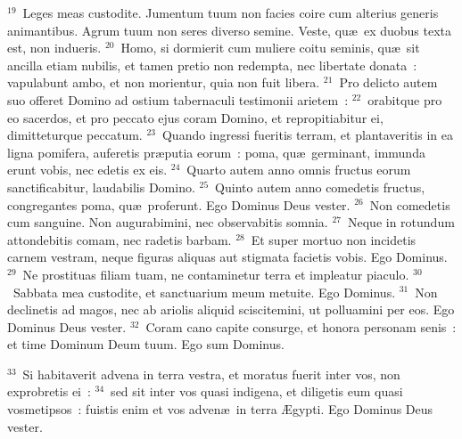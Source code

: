 ${}^{19}$~Leges meas custodite. Jumentum tuum non facies coire cum alterius generis animantibus. Agrum tuum non seres diverso semine. Veste, qu\ae\ ex duobus texta est, non indueris.
${}^{20}$~Homo, si dormierit cum muliere coitu seminis, qu\ae\ sit ancilla etiam nubilis, et tamen pretio non redempta, nec libertate donata~: vapulabunt ambo, et non morientur, quia non fuit libera.
${}^{21}$~Pro delicto autem suo offeret Domino ad ostium tabernaculi testimonii arietem~:
${}^{22}$~orabitque pro eo sacerdos, et pro peccato ejus coram Domino, et repropitiabitur ei, dimitteturque peccatum.
${}^{23}$~Quando ingressi fueritis terram, et plantaveritis in ea ligna pomifera, auferetis pr\ae putia eorum~: poma, qu\ae\ germinant, immunda erunt vobis, nec edetis ex eis.
${}^{24}$~Quarto autem anno omnis fructus eorum sanctificabitur, laudabilis Domino.
${}^{25}$~Quinto autem anno comedetis fructus, congregantes poma, qu\ae\ proferunt. Ego Dominus Deus vester.
${}^{26}$~Non comedetis cum sanguine. Non augurabimini, nec observabitis somnia.
${}^{27}$~Neque in rotundum attondebitis comam, nec radetis barbam.
${}^{28}$~Et super mortuo non incidetis carnem vestram, neque figuras aliquas aut stigmata facietis vobis. Ego Dominus.
${}^{29}$~Ne prostituas filiam tuam, ne contaminetur terra et impleatur piaculo.
${}^{30}$~Sabbata mea custodite, et sanctuarium meum metuite. Ego Dominus.
${}^{31}$~Non declinetis ad magos, nec ab ariolis aliquid sciscitemini, ut polluamini per eos. Ego Dominus Deus vester.
${}^{32}$~Coram cano capite consurge, et honora personam senis~: et time Dominum Deum tuum. Ego sum Dominus.


${}^{33}$~Si habitaverit advena in terra vestra, et moratus fuerit inter vos, non exprobretis ei~:
${}^{34}$~sed sit inter vos quasi indigena, et diligetis eum quasi vosmetipsos~: fuistis enim et vos adven\ae\ in terra \AE gypti. Ego Dominus Deus vester.


